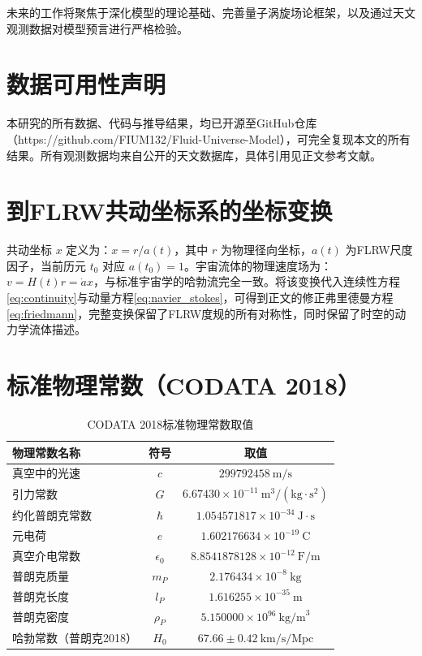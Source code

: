 \documentclass[aps,prd,preprint,superscriptaddress,floatfix,numbers,sort&compress]{revtex4-2}
\begin{document}
未来的工作将聚焦于深化模型的理论基础、完善量子涡旋场论框架，以及通过天文观测数据对模型预言进行严格检验。

\section*{数据可用性声明}
本研究的所有数据、代码与推导结果，均已开源至GitHub仓库（https://github.com/FIUM132/Fluid-Universe-Model），可完全复现本文的所有结果。所有观测数据均来自公开的天文数据库，具体引用见正文参考文献。

\appendix

\section{到FLRW共动坐标系的坐标变换}
共动坐标 $x$ 定义为：$x=r / a(t)$，其中 $r$ 为物理径向坐标，$a(t)$ 为FLRW尺度因子，当前历元 $t_{0}$ 对应 $a(t_{0})=1$。宇宙流体的物理速度场为：$v=H(t) r=\dot{a} x$，与标准宇宙学的哈勃流完全一致。将该变换代入连续性方程\eqref{eq:continuity}与动量方程\eqref{eq:navier_stokes}，可得到正文的修正弗里德曼方程\eqref{eq:friedmann}，完整变换保留了FLRW度规的所有对称性，同时保留了时空的动力学流体描述。

\section{标准物理常数（CODATA 2018）}
\begin{table}[h]
\centering
\caption{CODATA 2018标准物理常数取值}
\begin{tabular}{lcc}
\hline
物理常数名称 & 符号 & 取值 \\
\hline
真空中的光速 & $c$ & $299792458 \ \text{m/s}$ \\
引力常数 & $G$ & $6.67430 \times 10^{-11} \ \text{m}^3/(\text{kg} \cdot \text{s}^2)$ \\
约化普朗克常数 & $\hbar$ & $1.054571817 \times 10^{-34} \ \text{J} \cdot \text{s}$ \\
元电荷 & $e$ & $1.602176634 \times 10^{-19} \ \text{C}$ \\
真空介电常数 & $\epsilon_0$ & $8.8541878128 \times 10^{-12} \ \text{F/m}$ \\
普朗克质量 & $m_P$ & $2.176434 \times 10^{-8} \ \text{kg}$ \\
普朗克长度 & $l_P$ & $1.616255 \times 10^{-35} \ \text{m}$ \\
普朗克密度 & $\rho_P$ & $5.150000 \times 10^{96} \ \text{kg/m}^3$ \\
哈勃常数（普朗克2018） & $H_0$ & $67.66 \pm 0.42 \ \text{km/s/Mpc}$ \\
\hline
\end{tabular}
\label{tab:physical_constants}
\end{table}
\end{document}
